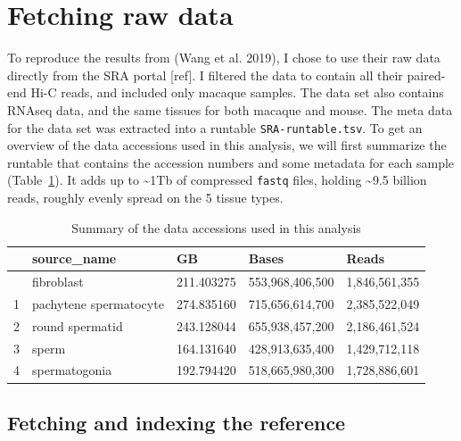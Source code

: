 \documentclass[
  11pt,
  a4paper,
]{scrbook}
\begin{document}
\section{Fetching raw data}\label{fetching-raw-data}

To reproduce the results from (Wang et al. 2019), I chose to use their
raw data directly from the SRA portal {[}ref{]}. I filtered the data to
contain all their paired-end Hi-C reads, and included only macaque
samples. The data set also contains RNAseq data, and the same tissues
for both macaque and mouse. The meta data for the data set was extracted
into a runtable \texttt{SRA-runtable.tsv}. To get an overview of the
data accessions used in this analysis, we will first summarize the
runtable that contains the accession numbers and some metadata for each
sample (Table~\ref{tbl-runtable-summary}). It adds up to
\textasciitilde1Tb of compressed \texttt{fastq} files, holding
\textasciitilde9.5 billion reads, roughly evenly spread on the 5 tissue
types.

\small

\begin{longtable}[]{@{}lllll@{}}

\caption{\label{tbl-runtable-summary}Summary of the data accessions used
in this analysis}

\tabularnewline

\toprule\noalign{}
& source\_name & GB & Bases & Reads \\
\midrule\noalign{}
\endhead
\bottomrule\noalign{}
\endlastfoot
0 & fibroblast & 211.403275 & 553,968,406,500 & 1,846,561,355 \\
1 & pachytene spermatocyte & 274.835160 & 715,656,614,700 &
2,385,522,049 \\
2 & round spermatid & 243.128044 & 655,938,457,200 & 2,186,461,524 \\
3 & sperm & 164.131640 & 428,913,635,400 & 1,429,712,118 \\
4 & spermatogonia & 192.794420 & 518,665,980,300 & 1,728,886,601 \\

\end{longtable}

\normalsize

\subsection{Fetching and indexing the
reference}\label{fetching-and-indexing-the-reference}
\end{document}
